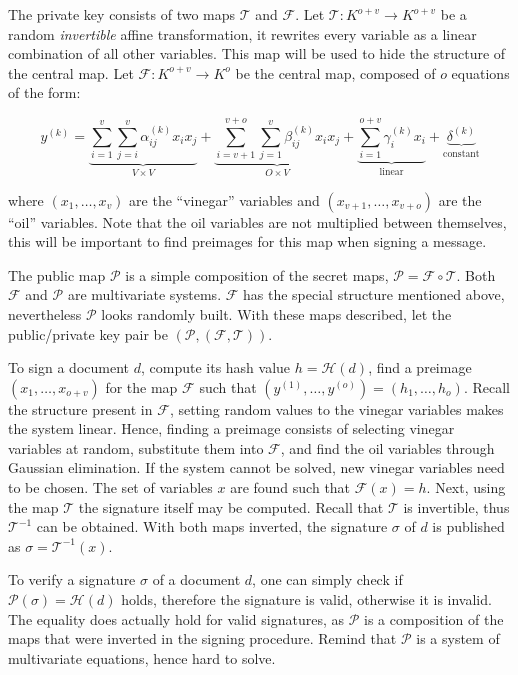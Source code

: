 \documentclass{ufsctex/ufsctex}
\begin{document}
The private key consists of two maps $\mathcal{T}$ and $\mathcal{F}$. Let
$\mathcal{T}: K^{o+v} \to K^{o+v}$ be a random \textit{invertible} affine
transformation, it rewrites every variable as a linear combination of all other
variables. This map will be used to hide the structure of the central map. Let
$\mathcal{F}: K^{o+v} \to K^{o}$ be the central map, composed of $o$ equations
of the form:

\begin{equation}\label{eq:ovpolynomial}
y^{(k)} =
\underbrace{\sum_{i=1}^{v}\sum_{j=i}^{v} \alpha^{(k)}_{ij} x_i x_j}_{
V \times V} +
\underbrace{\sum_{i=v+1}^{v+o}\sum_{j=1}^{v} \beta^{(k)}_{ij} x_i x_j}_{
O \times V} +
\underbrace{\sum_{i=1}^{o+v} \gamma^{(k)}_{i} x_i}_{\text{linear}} +
\underbrace{\delta^{(k)}}_{\text{constant}}
\end{equation}

where $(x_1,\dots,x_v)$ are the ``vinegar'' variables and
$(x_{v+1},\dots,x_{v+o})$ are the ``oil'' variables. Note that the oil
variables are not multiplied between themselves, this will be important to find
preimages for this map when signing a message.

The public map $\mathcal{P}$ is a simple composition of the secret maps,
$\mathcal{P} = \mathcal{F} \circ \mathcal{T}$. Both $\mathcal{F}$ and
$\mathcal{P}$ are multivariate systems. $\mathcal{F}$ has the special structure
mentioned above, nevertheless $\mathcal{P}$ looks randomly built. With these
maps described, let the public/private key pair be
$(\mathcal{P},(\mathcal{F},\mathcal{T}))$.

To sign a document $d$, compute its hash value $h = \mathcal{H}(d)$, find a
preimage $(x_1,\dots,x_{o+v})$ for the map $\mathcal{F}$ such that
$(y^{(1)},\dots,y^{(o)}) = (h_1,\dots,h_o)$. Recall the structure present in
$\mathcal{F}$, setting random values to the vinegar variables makes the system
linear. Hence, finding a preimage consists of selecting vinegar variables at
random, substitute them into $\mathcal{F}$, and find the oil variables through
Gaussian elimination. If the system cannot be solved, new vinegar variables
need to be chosen. The set of variables $x$ are found such that
$\mathcal{F}(x)=h$. Next, using the map $\mathcal{T}$ the signature itself may
be computed. Recall that $\mathcal{T}$ is invertible, thus $\mathcal{T}^{-1}$
can be obtained. With both maps inverted, the signature $\sigma$ of $d$ is
published as $\sigma = \mathcal{T}^{-1}(x)$.

To verify a signature $\sigma$ of a document $d$, one can simply check if
$\mathcal{P}(\sigma) = \mathcal{H}(d)$ holds, therefore the signature is valid,
otherwise it is invalid. The equality does actually hold for valid signatures,
as $\mathcal{P}$ is a composition of the maps that were inverted in the signing
procedure. Remind that $\mathcal{P}$ is a system of multivariate equations,
hence hard to solve.
\end{document}
